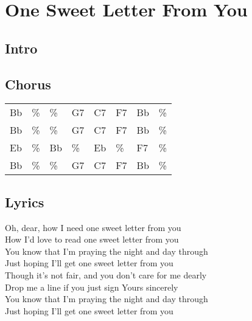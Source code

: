 \section{One Sweet Letter From You}


\subsection*{Intro}


\subsection*{Chorus}


\begin{tabular}{l l l l l l l l}
Bb & \% & \% & G7 & C7 & F7 & Bb & \% \\ 
Bb & \% & \% & G7 & C7 & F7 & Bb & \% \\ 
Eb & \% & Bb & \% & Eb & \% & F7 & \% \\ 
Bb & \% & \% & G7 & C7 & F7 & Bb & \% \\ 
\end{tabular}


\subsection*{Lyrics}


Oh, dear, how I need one sweet letter from you \\ 
How I'd love to read one sweet letter from you \\ 
You know that I'm praying the night and day through \\ 
Just hoping I'll get one sweet letter from you \\ 
Though it's not fair, and you don't care for me dearly \\ 
Drop me a line if you just sign Yours sincerely \\ 
You know that I'm praying the night and day through \\ 
Just hoping I'll get one sweet letter from you \\ 
